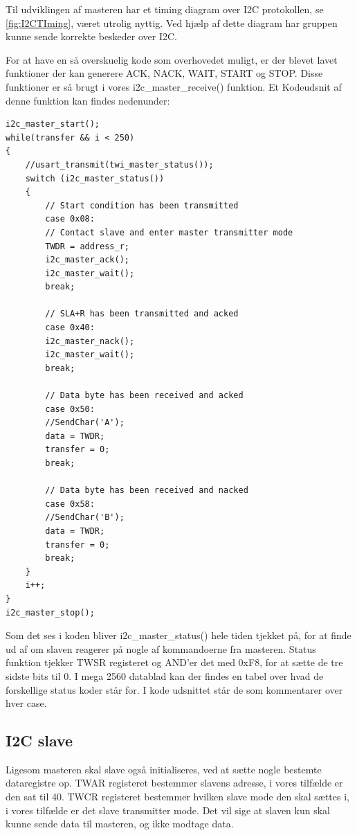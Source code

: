 Til udviklingen af masteren har et timing diagram over I2C protokollen, se \autoref{fig:I2CTIming}, været utrolig nyttig. Ved hjælp af dette diagram har gruppen kunne sende korrekte beskeder over I2C. 

For at have en så overskuelig kode som overhovedet muligt, er der blevet lavet funktioner der kan generere ACK, NACK, WAIT, START og STOP. Disse funktioner er så brugt i vores i2c\_master\_receive() funktion. Et Kodeudsnit af denne funktion kan findes nedenunder:

\newpage

\begin{lstlisting}
i2c_master_start();
while(transfer && i < 250)
{
	//usart_transmit(twi_master_status());
	switch (i2c_master_status())
	{
		// Start condition has been transmitted
		case 0x08:
		// Contact slave and enter master transmitter mode
		TWDR = address_r;
		i2c_master_ack();
		i2c_master_wait();
		break;
		
		// SLA+R has been transmitted and acked
		case 0x40:
		i2c_master_nack();
		i2c_master_wait();
		break;
		
		// Data byte has been received and acked
		case 0x50:
		//SendChar('A');
		data = TWDR;
		transfer = 0;
		break;
		
		// Data byte has been received and nacked
		case 0x58:
		//SendChar('B');
		data = TWDR;
		transfer = 0;
		break;
	}
	i++;
}
i2c_master_stop();
\end{lstlisting}

Som det ses i koden bliver i2c\_master\_status() hele tiden tjekket på, for at finde ud af om slaven reagerer på nogle af kommandoerne fra masteren. Status funktion tjekker TWSR registeret og AND'er det med 0xF8, for at sætte de tre sidste bits til 0. I mega 2560 datablad kan der findes en tabel over hvad de forskellige status koder står for\cite{man:mega2560Kap24}. I kode udsnittet står de som kommentarer over hver case.

\subsection{I2C slave}
Ligesom masteren skal slave også initialiseres, ved at sætte nogle bestemte dataregistre op. TWAR registeret bestemmer slavens adresse, i vores tilfælde er den sat til 40. TWCR registeret bestemmer hvilken slave mode den skal sættes i, i vores tilfælde er det slave transmitter mode. Det vil sige at slaven kun skal kunne sende data til masteren, og ikke modtage data. 


